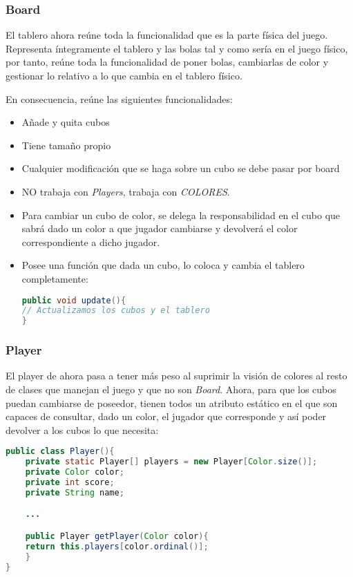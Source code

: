 \documentclass{article}
\begin{document}
\subsubsection*{Board}
El tablero ahora reúne toda la funcionalidad que es la parte física del juego. Representa íntegramente el tablero y las bolas tal y como sería en el juego físico, por tanto, reúne toda la funcionalidad de poner bolas, cambiarlas de color y gestionar lo relativo a lo que cambia en el tablero físico.

En consecuencia, reúne las siguientes funcionalidades:
\begin{itemize}
\item Añade y quita cubos
\item Tiene tamaño propio
\item Cualquier modificación que se haga sobre un cubo se debe pasar por board
\item NO trabaja con \textit{Players}, trabaja con \textit{COLORES}.
\item Para cambiar un cubo de color, se delega la responsabilidad en el cubo que sabrá dado un color a que jugador cambiarse y devolverá el color correspondiente a dicho jugador.
\item Posee una función que dada un cubo, lo coloca y cambia el tablero completamente:
\begin{lstlisting}[language=Java]
public void update(){
// Actualizamos los cubos y el tablero
}
\end{lstlisting}
\end{itemize}

\subsubsection*{Player}
El player de ahora pasa a tener más peso al suprimir la visión de colores al resto de clases que manejan el juego y que no son \textit{Board}. Ahora, para que los cubos puedan cambiarse de poseedor, tienen todos un atributo estático en el que son capaces de consultar, dado un color, el jugador que corresponde y así poder devolver a los cubos lo que necesita:
\begin{lstlisting}[language=Java]
public class Player(){
	private static Player[] players = new Player[Color.size()];
	private Color color;
	private int score;
	private String name;

	...

	public Player getPlayer(Color color){
	return this.players[color.ordinal()];
	}
}
\end{lstlisting}
\end{document}
